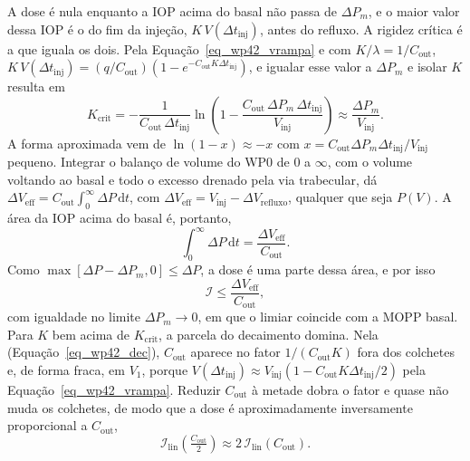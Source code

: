 A dose é nula enquanto a IOP acima do basal não passa de $\Delta P_{m}$, e o maior valor dessa IOP é o do fim da injeção, $K\,V(\Delta t_{\text{inj}})$, antes do refluxo. A rigidez crítica é a que iguala os dois. Pela Equação~\ref{eq_wp42_vrampa} e com $K/\lambda=1/C_{\text{out}}$, $K\,V(\Delta t_{\text{inj}})=(q/C_{\text{out}})\left(1-e^{-C_{\text{out}}K\Delta t_{\text{inj}}}\right)$, e igualar esse valor a $\Delta P_{m}$ e isolar $K$ resulta em
\begin{equation}
K_{\text{crit}}=-\frac{1}{C_{\text{out}}\,\Delta t_{\text{inj}}}\ln\!\left(1-\frac{C_{\text{out}}\,\Delta P_{m}\,\Delta t_{\text{inj}}}{V_{\text{inj}}}\right)\approx\frac{\Delta P_{m}}{V_{\text{inj}}}.
\label{eq_wp43_kcrit}
\end{equation}
A forma aproximada vem de $\ln(1-x)\approx-x$ com $x=C_{\text{out}}\Delta P_{m}\Delta t_{\text{inj}}/V_{\text{inj}}$ pequeno. Integrar o balanço de volume do WP0 de $0$ a $\infty$, com o volume voltando ao basal e todo o excesso drenado pela via trabecular, dá $\Delta V_{\text{eff}}=C_{\text{out}}\int_{0}^{\infty}\Delta P\,\mathrm{d}t$, com $\Delta V_{\text{eff}}=V_{\text{inj}}-\Delta V_{\text{refluxo}}$, qualquer que seja $P(V)$. A área da IOP acima do basal é, portanto,
\begin{equation}
\int_{0}^{\infty}\Delta P\,\mathrm{d}t=\frac{\Delta V_{\text{eff}}}{C_{\text{out}}}.
\label{eq_wp43_area}
\end{equation}
Como $\max[\Delta P-\Delta P_{m},0]\le\Delta P$, a dose é uma parte dessa área, e por isso
\begin{equation}
\mathcal{I}\le\frac{\Delta V_{\text{eff}}}{C_{\text{out}}},
\label{eq_wp43_teto}
\end{equation}
com igualdade no limite $\Delta P_{m}\to0$, em que o limiar coincide com a MOPP basal. Para $K$ bem acima de $K_{\text{crit}}$, a parcela do decaimento domina. Nela (Equação~\ref{eq_wp42_dec}), $C_{\text{out}}$ aparece no fator $1/(C_{\text{out}}K)$ fora dos colchetes e, de forma fraca, em $V_1$, porque $V(\Delta t_{\text{inj}})\approx V_{\text{inj}}\left(1-C_{\text{out}}K\Delta t_{\text{inj}}/2\right)$ pela Equação~\ref{eq_wp42_vrampa}. Reduzir $C_{\text{out}}$ à metade dobra o fator e quase não muda os colchetes, de modo que a dose é aproximadamente inversamente proporcional a $C_{\text{out}}$,
\begin{equation}
\mathcal{I}_{\text{lin}}\!\left(\tfrac{C_{\text{out}}}{2}\right)\approx2\,\mathcal{I}_{\text{lin}}\!\left(C_{\text{out}}\right).
\label{eq_wp43_escala}
\end{equation}



